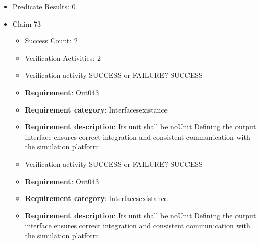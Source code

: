 \documentclass{article}
\begin{document}
\begin{itemize}
\begin{itemize}
						\item \textbf{Requirement}: Out042 
						\item \textbf{Requirement category}: Interfacesexistance 
						\item \textbf{Requirement description}: Its unit shall be noUnit Defining the output interface ensures correct integration and consistent communication with the simulation platform.
					
					\item Verification activity SUCCESS or FAILURE? SUCCESS
		
						\item \textbf{Requirement}: Out042 
						\item \textbf{Requirement category}: Interfacesexistance 
						\item \textbf{Requirement description}: Its unit shall be noUnit Defining the output interface ensures correct integration and consistent communication with the simulation platform.
					
				\end{itemize}
				
									    
				\item Predicate Results: 0

  				  \item Claim 73
				\begin{itemize}
			    	\item Success Count: 2 
			    	\item Verification Activities: 2
					\item Verification activity SUCCESS or FAILURE? SUCCESS
		
						\item \textbf{Requirement}: Out043 
						\item \textbf{Requirement category}: Interfacesexistance 
						\item \textbf{Requirement description}: Its unit shall be noUnit Defining the output interface ensures correct integration and consistent communication with the simulation platform.
					
					\item Verification activity SUCCESS or FAILURE? SUCCESS
		
						\item \textbf{Requirement}: Out043 
						\item \textbf{Requirement category}: Interfacesexistance 
						\item \textbf{Requirement description}: Its unit shall be noUnit Defining the output interface ensures correct integration and consistent communication with the simulation platform.
					

\end{itemize}
\end{itemize}
\end{document}
